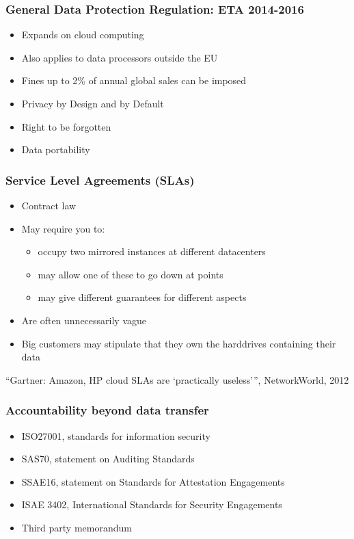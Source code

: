 \documentclass{beamer}
\begin{document}
\begin{frame}
    \frametitle{General Data Protection Regulation: ETA 2014-2016}
    \begin{itemize}
    \item Expands on cloud computing
    \item Also applies to data processors outside the EU
    \item Fines up to 2\% of annual global sales can be imposed
    \end{itemize}

    \begin{itemize}
    \item Privacy by Design and by Default
    \item Right to be forgotten
    \item Data portability
    \end{itemize}
\end{frame}

\begin{frame}
    \frametitle{Service Level Agreements (SLAs)}
    \begin{itemize}
    \item Contract law
    \item May require you to:
      \begin{itemize} %
        \item occupy two mirrored instances at different datacenters
        \item may allow one of these to go down at points
        \item may give different guarantees for different aspects
      \end{itemize}
    \item Are often unnecessarily vague
    \item Big customers may stipulate that they own the harddrives containing their data
    \end{itemize}
    \footnotesize{``Gartner: Amazon, HP cloud SLAs are `practically useless''', NetworkWorld, 2012}
\end{frame}

\begin{frame}
    \frametitle{Accountability beyond data transfer}
    \begin{itemize}
    \item ISO27001, standards for information security
    \item SAS70, statement on Auditing Standards
    \item SSAE16, statement on Standards for Attestation Engagements
    \item ISAE 3402, International Standards for Security Engagements
    \item Third party memorandum 
    \end{itemize}
\end{frame}
\end{document}
